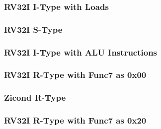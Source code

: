 

\subsubsection[{\small RV32I I-Type with Loads}]{RV32I I-Type with Loads} \label{sec:format-RV32I-ILoad}



\subsubsection[{\small RV32I S-Type}]{RV32I S-Type} \label{sec:format-RV32I-SType}



\subsubsection[{\small RV32I I-Type with ALU Instructions}]{RV32I I-Type with ALU Instructions} \label{sec:format-RV32I-I-ALU}



\subsubsection[{\small RV32I R-Type with Func7 as 0x00}]{RV32I R-Type with Func7 as 0x00} \label{sec:format-RV32I-RF00}



\subsubsection[{\small Zicond R-Type}]{Zicond R-Type} \label{sec:format-RVZI-COND}



\subsubsection[{\small RV32I R-Type with Func7 as 0x20}]{RV32I R-Type with Func7 as 0x20} \label{sec:format-RV32I-RF20}




